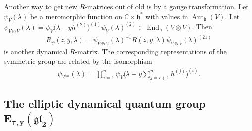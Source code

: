 \documentclass[pdftex]{sigma}
\numberwithin{equation}{section}
\begin{document}
Another way to get new $R$-matrices out of old is by a gauge transformation. Let $\psi_V(\lambda)$ be a meromorphic function on $\mathbb C\times \mathfrak h^*$ with values in $\operatorname{Aut}_{\mathfrak h}(V)$. Let
$\psi_{V\otimes V}(\lambda)=\psi_V\big(\lambda-y h^{(2)}\big)^{(1)}\psi_V(\lambda)^{(2)}\in\operatorname{End}_{\mathfrak h}(V\otimes V)$. Then
\begin{gather*}
 R_\psi(z,y,\lambda)=\psi_{V\otimes V}(\lambda)^{-1}R(z,y,\lambda)\psi_{V\otimes V}(\lambda)^{(21)}
\end{gather*}
is another dynamical $R$-matrix. The corresponding representations of the symmetric group are related by the isomorphism
\begin{gather*} \psi_{V^{\otimes n}}(\lambda)=\prod_{i=1}^n\psi_{V}\bigg(\lambda-y\sum_{j=i+1}^nh^{(j)}\bigg)^{(i)}.\end{gather*}

\subsection[The elliptic dynamical quantum group $E_{\tau,y}(\mathfrak{gl}_2)$]{The elliptic dynamical quantum group $\boldsymbol{E_{\tau,y}(\mathfrak{gl}_2)}$}\label{ss-2.3}
\end{document}
